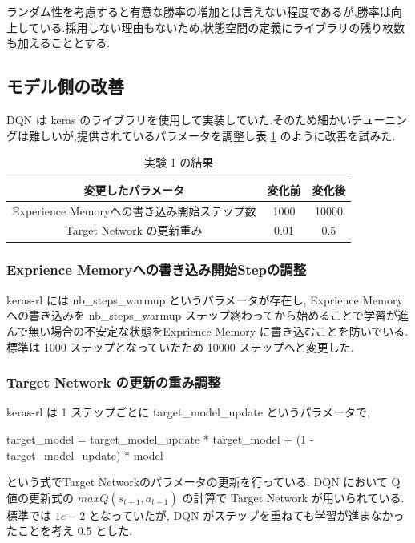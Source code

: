 \documentclass{jarticle}     %
\begin{document}
ランダム性を考慮すると有意な勝率の増加とは言えない程度であるが,勝率は向上している.採用しない理由もないため,状態空間の定義にライブラリの残り枚数も加えることとする.

\subsection{モデル側の改善}
DQN は keras のライブラリを使用して実装していた.そのため細かいチューニングは難しいが,提供されているパラメータを調整し表 \ref{table:modelpram} のように改善を試みた\cite{DQNparam}.

\begin{table}[H]
  \centering
  \caption{実験 1 の結果}
  \label{table:modelpram}
  \begin{tabular}{|c|c|c|}
  \hline
  変更したパラメータ                      & 変化前  & 変化後   \\ \hline
  Experience Memoryへの書き込み開始ステップ数 & 1000 & 10000 \\ \hline
  Target Network の更新重み           & 0.01 & 0.5   \\ \hline
  \end{tabular}
  \end{table}

\subsubsection{Exprience Memoryへの書き込み開始Stepの調整}
keras-rl には nb\_steps\_warmup というパラメータが存在し, Exprience Memory への書き込みを nb\_steps\_warmup ステップ終わってから始めることで学習が進んで無い場合の不安定な状態をExprience Memory に書き込むことを防いでいる. 標準は 1000 ステップとなっていたため 10000 ステップへと変更した.

\subsubsection{Target Network の更新の重み調整}
keras-rl は 1 ステップごとに target\_model\_update というパラメータで, \par
target\_model = target\_model\_update * target\_model + (1 - target\_model\_update) * model
\par
という式でTarget Networkのパラメータの更新を行っている.
 DQN において Q 値の更新式の $maxQ(s_{t+1},a_{t+1})$ の計算で Target Network が用いられている\cite{targetnetwork}.標準では $1e-2$ となっていたが, DQN がステップを重ねても学習が進まなかったことを考え 0.5 とした.
\end{document}
